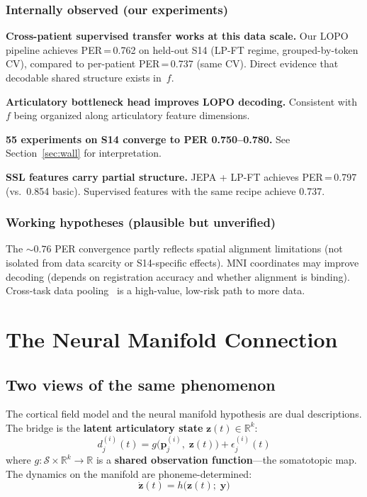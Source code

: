 \documentclass[11pt,letterpaper]{article}
\newcommand{\bfp}{\mathbf{p}}
\newcommand{\bfz}{\mathbf{z}}
\newcommand{\bfy}{\mathbf{y}}
\newcommand{\cS}{\mathcal{S}}
\newcommand{\R}{\mathbb{R}}
\begin{document}
\subsubsection{Internally observed (our experiments)}

\textbf{Cross-patient supervised transfer works at this data scale.} Our LOPO pipeline achieves PER\,=\,0.762 on held-out S14 (LP-FT regime, grouped-by-token CV), compared to per-patient PER\,=\,0.737 (same CV). Direct evidence that decodable shared structure exists in~$f$.

\textbf{Articulatory bottleneck head improves LOPO decoding.} Consistent with $f$ being organized along articulatory feature dimensions.

\textbf{55 experiments on S14 converge to PER 0.750--0.780.} See Section~\ref{sec:wall} for interpretation.

\textbf{SSL features carry partial structure.} JEPA + LP-FT achieves PER\,=\,0.797 (vs.\ 0.854 basic). Supervised features with the same recipe achieve 0.737.

\subsubsection{Working hypotheses (plausible but unverified)}

The ${\sim}0.76$ PER convergence partly reflects spatial alignment limitations (not isolated from data scarcity or S14-specific effects). MNI coordinates may improve decoding (depends on registration accuracy and whether alignment is binding). Cross-task data pooling~\cite{duraivel2025} is a high-value, low-risk path to more data.


\section{The Neural Manifold Connection}\label{sec:manifold}

\subsection{Two views of the same phenomenon}

The cortical field model and the neural manifold hypothesis are dual descriptions. The bridge is the \textbf{latent articulatory state} $\bfz(t) \in \R^k$:
\begin{equation}\label{eq:obs-function}
\boxed{d_j^{(i)}(t) = g\bigl(\bfp_j^{(i)},\; \bfz(t)\bigr) + \epsilon_j^{(i)}(t)}
\end{equation}
where $g: \cS \times \R^k \to \R$ is a \textbf{shared observation function}---the somatotopic map. The dynamics on the manifold are phoneme-determined:
\begin{equation}\label{eq:dynamics}
\dot{\bfz}(t) = h\bigl(\bfz(t);\; \bfy\bigr)
\end{equation}
\end{document}
